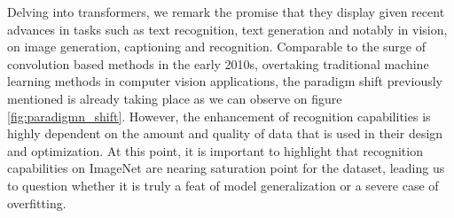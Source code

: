 \noindent Delving into transformers, we remark the promise that they display 
given recent advances in tasks such as text recognition, text generation and notably in vision, 
on image generation, captioning and recognition. Comparable to the surge of convolution 
based methods in the early 2010s, overtaking traditional machine learning methods in computer 
vision applications, the paradigm shift previously mentioned is already taking place as 
we can observe on figure \autoref{fig:paradigmn_shift}. However, the enhancement of recognition 
capabilities is highly dependent on the amount and quality of data that is used in their 
design and optimization. At this point, it is important to highlight that recognition capabilities 
on ImageNet are nearing saturation point for the dataset, leading us to question whether it is 
truly a feat of model generalization or a severe case of overfitting.

